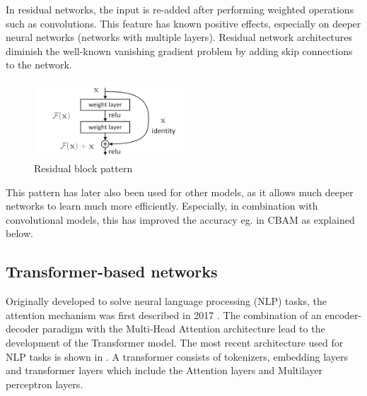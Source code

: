 In residual networks, the input is re-added after performing weighted operations such as convolutions. This feature has known positive effects, especially on deeper neural networks (networks with multiple layers). Residual network architectures diminish the well-known vanishing gradient problem by adding skip connections to the network. 

\begin{figure}[H]
    \centering
    \includegraphics[width=0.5\textwidth]{Figures/ResBlockVariants.png}
    \caption{Residual block pattern}
    \label{fig:res_block}
\end{figure}

This pattern has later also been used for other models, as it allows much deeper networks to learn much more efficiently. Especially, in combination with convolutional models, this has improved the accuracy eg. in CBAM as explained below.

    

\subsection{Transformer-based networks}

Originally developed to solve neural language processing (NLP) tasks, the attention mechanism was first described in 2017 \cite{vaswani_attention_2023}.
The combination of an encoder-decoder paradigm with the Multi-Head Attention architecture lead to the development of the Transformer model. The most recent architecture used for NLP tasks is shown in .
A transformer consists of tokenizers, embedding layers and transformer layers which include the Attention layers and Multilayer perceptron layers.

